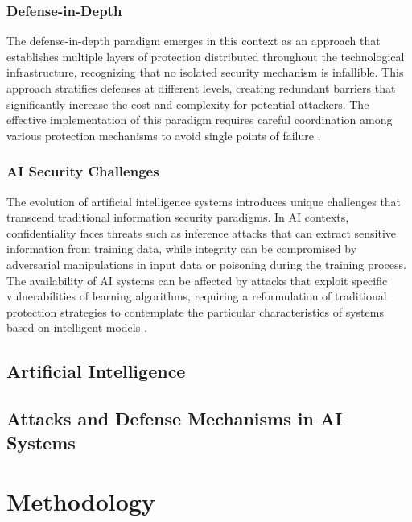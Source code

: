 \documentclass[twoside,brazilian,english]{UNISINOSmonografia}
\begin{document}
\subsection{Defense-in-Depth}

The defense-in-depth paradigm emerges in this context as an approach that establishes multiple layers of protection distributed throughout the technological infrastructure, recognizing that no isolated security mechanism is infallible. This approach stratifies defenses at different levels, creating redundant barriers that significantly increase the cost and complexity for potential attackers. The effective implementation of this paradigm requires careful coordination among various protection mechanisms to avoid single points of failure \cite{Stallings2018}.

\subsection{AI Security Challenges}

The evolution of artificial intelligence systems introduces unique challenges that transcend traditional information security paradigms. In AI contexts, confidentiality faces threats such as inference attacks that can extract sensitive information from training data, while integrity can be compromised by adversarial manipulations in input data or poisoning during the training process. The availability of AI systems can be affected by attacks that exploit specific vulnerabilities of learning algorithms, requiring a reformulation of traditional protection strategies to contemplate the particular characteristics of systems based on intelligent models \cite{Papernot2018, Biggio2018}.

\section{Artificial Intelligence}

\section{Attacks and Defense Mechanisms in AI Systems}



\chapter{Methodology}
\end{document}
